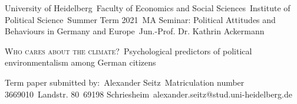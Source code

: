 \thispagestyle{empty}
\noindent
University of Heidelberg\
Faculty of Economics and Social Sciences\
Institute of Political Science\
Summer Term 2021\
MA Seminar: Political Attitudes and Behaviours in Germany and Europe\
Jun.-Prof. Dr. Kathrin Ackermann\
\begin{center}
\vspace*{6cm}
\huge\textsc{Who cares about the climate?}\
\LARGE{Psychological predictors of political environmentalism among German citizens}\
\vspace*{7cm}
\end{center}
\noindent
Term paper submitted by:\
Alexander Seitz\
Matriculation number 3669010\
Landstr. 80\
69198 Schriesheim\
alexander.seitz@stud.uni-heidelberg.de\